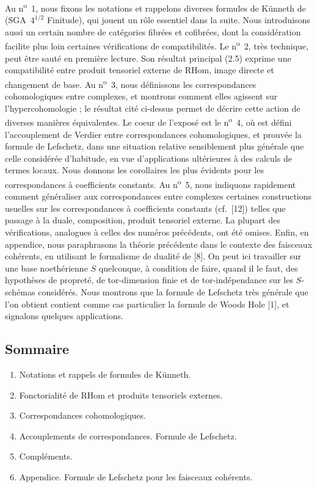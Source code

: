\documentclass[11pt]{article}
\providecommand{\RHom}{\mathrm{RHom}}
\providecommand{\RHom}{\mathrm{RHom}}
\providecommand{\RHom}{\mathrm R\mathcal{H}om}
\providecommand{\RHom}{\mathrm{RHom}}
\begin{document}
Au n\textsuperscript{o}~1, nous fixons les notations et rappelons diverses formules de Künneth de (SGA~$4^{1/2}$ Finitude), qui jouent un rôle essentiel dans la suite. Nous introduisons aussi un certain nombre de catégories fibrées et cofibrées, dont la considération facilite plus loin certaines vérifications de compatibilités. Le n\textsuperscript{o}~2, très technique, peut être sauté en première lecture. Son résultat principal (2.5) exprime une compatibilité entre produit tensoriel externe de $\RHom$, image directe et changement de base. Au n\textsuperscript{o}~3, nous définissons les correspondances cohomologiques entre complexes, et montrons comment elles agissent sur l'hypercohomologie ; le résultat cité ci-dessus permet de décrire cette action de diverses manières équivalentes. Le coeur de l'exposé est le n\textsuperscript{o}~4, où est défini l'accouplement de Verdier entre correspondances cohomologiques, et prouvée la formule de Lefschetz, dans une situation relative sensiblement plus générale que celle considérée d'habitude, en vue d'applications ultérieures à des calculs de termes locaux. Nous donnons les corollaires les plus évidents pour les correspondances à coefficients constants. Au n\textsuperscript{o}~5, nous indiquons rapidement comment généraliser aux correspondances entre complexes certaines constructions usuelles sur les correspondances à coefficients constants (cf.~[12]) telles que passage à la duale, composition, produit tensoriel externe. La plupart des vérifications, analogues à celles des numéros précédents, ont été omises. Enfin, en appendice, nous paraphrasons la théorie précédente dans le contexte des faisceaux cohérents, en utilisant le formalisme de dualité de [8]. On peut ici travailler sur une base noethérienne $S$ quelconque, à condition de faire, quand il le faut, des hypothèses de propreté, de tor-dimension finie et de tor-indépendance sur les $S$-schémas considérés. Nous montrons que la formule de Lefschetz très générale que l'on obtient contient comme cas particulier la formule de Woods Hole [1], et signalons quelques applications.

\subsection*{Sommaire}
\begin{enumerate}[label=\arabic*.]
\item Notations et rappels de formules de Künneth.
\item Fonctorialité de $\RHom$ et produits tensoriels externes.
\item Correspondances cohomologiques.
\item Accouplements de correspondances. Formule de Lefschetz.
\item Compléments.
\item Appendice. Formule de Lefschetz pour les faisceaux cohérents.
\end{enumerate}
\end{document}
